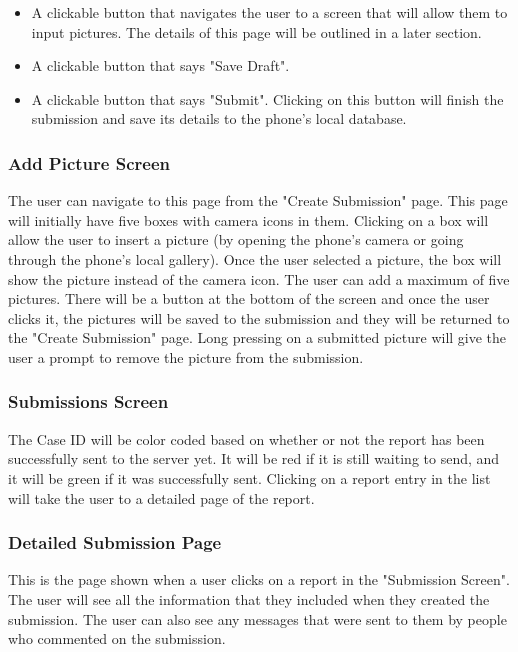 \documentclass[onecolumn, draftclsnofoot,10pt, compsoc]{IEEEtran}
\begin{document}
\begin{itemize}
\item A clickable button that navigates the user to a screen that will allow them to input pictures. The details of this page will be outlined in a later section.

\item A clickable button that says "Save Draft".

\item A clickable button that says "Submit". Clicking on this button will finish the submission and save its details to the phone's local database.
\end{itemize}

\subsubsection{Add Picture Screen}
The user can navigate to this page from the "Create Submission" page. This page will initially have five boxes with camera icons in them. Clicking on a box will allow the user to insert a picture (by opening the phone's camera or going through the phone's local gallery). Once the user selected a picture, the box will show the picture instead of the camera icon. The user can add a maximum of five pictures. There will be a button at the bottom of the screen and once the user clicks it, the pictures will be saved to the submission and they will be returned to the "Create Submission" page. Long pressing on a submitted picture will give the user a prompt to remove the picture from the submission.




\subsubsection{Submissions Screen}
The Case ID will be color coded based on whether or not the report has been successfully sent to the server yet. It will be red if it is still waiting to send, and it will be green if it was successfully sent. Clicking on a report entry in the list will take the user to a detailed page of the report.


\subsubsection{Detailed Submission Page}
This is the page shown when a user clicks on a report in the "Submission Screen". The user will see all the information that they included when they created the submission. The user can also see any messages that were sent to them by people who commented on the submission.
\end{document}
